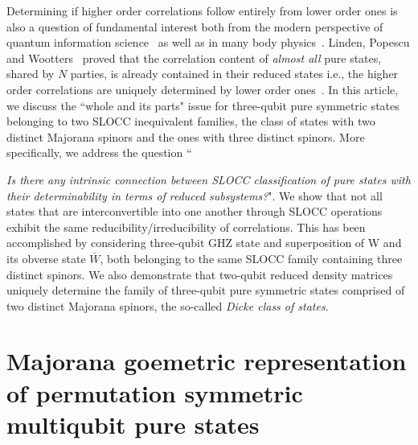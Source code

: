 \documentclass[pra,preprint,a4paper,superscriptaddress]{revtex4}
\begin{document}
Determining if higher order correlations follow entirely from lower order ones is also a question 
of fundamental interest both from the modern perspective of quantum information science~\cite{SP1,SP2,SP2b} as well as in 
many body physics~\cite{Coleman}. Linden, Popescu and Wootters~\cite{SP1,SP2,SP2b} proved that 
the correlation content of {\em almost all} pure states, shared by $N$ parties, is already contained in 
their reduced states i.e., the higher order correlations are uniquely determined by lower order ones~\cite{SP1,SP2,SP2b}.  
In this article, we discuss the ``whole and its parts" issue for three-qubit pure symmetric states belonging to two SLOCC inequivalent families, the class of states with two distinct Majorana spinors and the ones with three distinct spinors. More specifically, we address the question ``{\emph{Is there any intrinsic connection between SLOCC classification of 
pure states with their determinability in terms of reduced subsystems?}". We show that not all states that are interconvertible into one another through SLOCC operations exhibit the same reducibility/irreducibility of correlations. This has been accomplished by considering three-qubit GHZ state and superposition of W and its obverse state $\bar{W}$, both belonging to the same SLOCC family containing three distinct spinors.   We also demonstrate that two-qubit reduced density matrices uniquely determine the family of three-qubit  pure symmetric states comprised of two distinct Majorana spinors, the so-called {\emph {Dicke class of states}}. 
 
\section{Majorana goemetric representation of permutation symmetric multiqubit pure states} 

}
\end{document}

